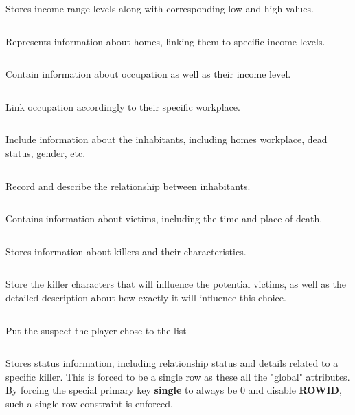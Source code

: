 \documentclass{llncs}
\begin{document}
\inputminted[firstline=25,lastline=31]{sql}{DDL.sql}
Stores income range levels along with corresponding low and high values.

\inputminted[firstline=33,lastline=39]{sql}{DDL.sql}
Represents information about homes, linking them to specific income levels.

\inputminted[firstline=41,lastline=46]{sql}{DDL.sql}
Contain information about occupation as well as their income level.

\inputminted[firstline=48,lastline=56]{sql}{DDL.sql}
Link occupation accordingly to their specific workplace.

\inputminted[firstline=58,lastline=71]{sql}{DDL.sql}
Include information about the inhabitants, including homes workplace, dead status, gender, etc.

\inputminted[firstline=73,lastline=80]{sql}{DDL.sql}
Record and describe the relationship between inhabitants.

\inputminted[firstline=82,lastline=90]{sql}{DDL.sql}
Contains information about victims, including the time and place of death.

\inputminted[firstline=92,lastline=98]{sql}{DDL.sql}
Stores information about killers and their characteristics.

\inputminted[firstline=100,lastline=106]{sql}{DDL.sql}
Store the killer characters that will influence the potential victims, as well as the detailed description about how exactly it will influence this choice.

\inputminted[firstline=106,lastline=109]{sql}{DDL.sql}
Put the suspect the player chose to the list

\inputminted[firstline=111,lastline=120]{sql}{DDL.sql}
Stores status information, including relationship status and details related to a specific killer. This is forced to be a single row as these all the "global" attributes. By forcing the special primary key \textbf{single} to always be 0 and disable \textbf{ROWID}, such a single row constraint is enforced.
\end{document}
